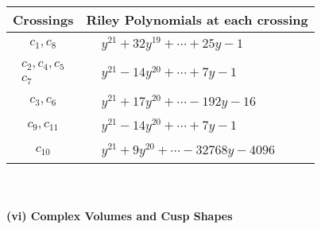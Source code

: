 \documentclass[1p]{elsarticle_modified}
\theoremstyle{definition}
\begin{document}
\begin{tabular}{m{50pt}|m{274pt}}
Crossings & \hspace{64pt}Riley Polynomials at each crossing \\
\hline $$\begin{aligned}c_{1},c_{8}\end{aligned}$$&$\begin{aligned}
&y^{21}+32 y^{19}+\cdots+25 y-1
\end{aligned}$\\
\hline $$\begin{aligned}c_{2},c_{4},c_{5}\\c_{7}\end{aligned}$$&$\begin{aligned}
&y^{21}-14 y^{20}+\cdots+7 y-1
\end{aligned}$\\
\hline $$\begin{aligned}c_{3},c_{6}\end{aligned}$$&$\begin{aligned}
&y^{21}+17 y^{20}+\cdots-192 y-16
\end{aligned}$\\
\hline $$\begin{aligned}c_{9},c_{11}\end{aligned}$$&$\begin{aligned}
&y^{21}-14 y^{20}+\cdots+7 y-1
\end{aligned}$\\
\hline $$\begin{aligned}c_{10}\end{aligned}$$&$\begin{aligned}
&y^{21}+9 y^{20}+\cdots-32768 y-4096
\end{aligned}$\\
\hline
\end{tabular}\\~\\
\newpage\flushleft \textbf{(vi) Complex Volumes and Cusp Shapes}
\end{document}
